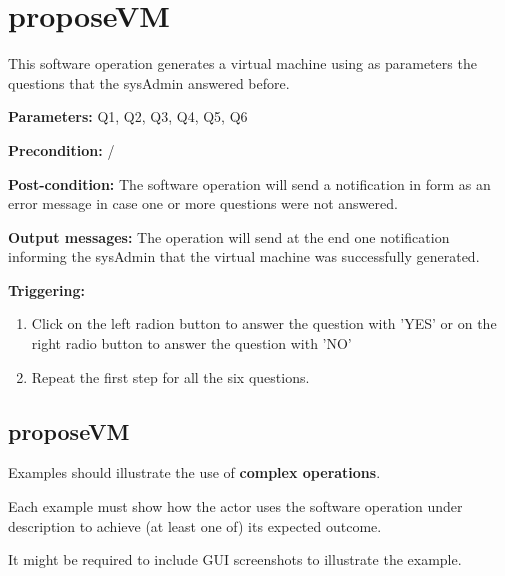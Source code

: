 \section{proposeVM}
\label{operation:proposeVM}
This software operation generates a virtual machine using as parameters the
questions that the sysAdmin answered before.
\begin{description}

\item \textbf{Parameters:} Q1, Q2, Q3, Q4, Q5, Q6
\item \textbf{Precondition:} /
\item \textbf{Post-condition:} The software operation will send a notification
in form as an error message in case one or more questions were not answered.
\item \textbf{Output messages:} The operation will send at the end one
notification informing the sysAdmin that the virtual machine was successfully
generated.

\item \textbf{Triggering:}
\begin{enumerate}
\item Click on the left radion button to answer the question with 'YES' or on
the right radio button to answer the question with 'NO'
\item Repeat the first step for all the six questions.
\end{enumerate}

 
\end{description}

\subsection{proposeVM}
Examples should illustrate the use of \textbf{complex operations}.

Each example must show how the actor uses the software operation under
description to achieve (at least one of) its expected outcome.

It might be required to include GUI screenshots to illustrate the example.
















